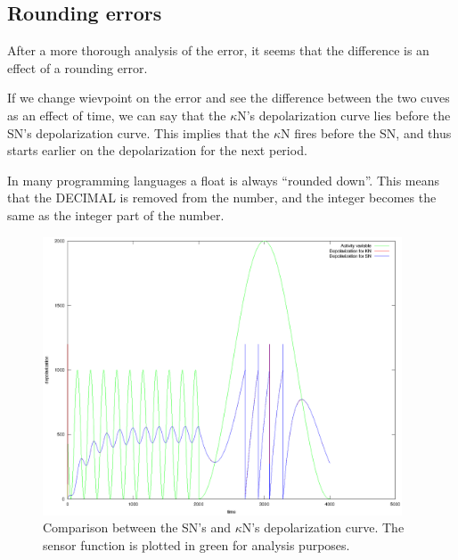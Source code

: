 	\subsection{Rounding errors}
After a more thorough analysis of the error, it seems that the difference is an effect of a rounding error.

If we change wievpoint on the error and see the difference between the two cuves as an effect of time, we can say that the $\kappa$N's depolarization curve lies before the SN's depolarization curve.
This implies that the $\kappa$N fires before the SN, and thus starts earlier on the depolarization for the next period.

In many programming languages a float is always ``rounded down''. This means that the DECIMAL %
	is removed from the number, and the integer becomes the same as the integer part of the number.

\begin{figure}[hb!tp]
	\centering
		\includegraphics[width=0.95\textwidth]{eps_Comparison_between_the_two_sensors__depol_FIKSA.eps}
	\caption{Comparison between the SN's and $\kappa$N's depolarization curve. The sensor function is plotted in green for analysis purposes.}
	\label{figComparisonBetweenSsensorAndKsensorDepolCurveFIXEdError}
\end{figure}

